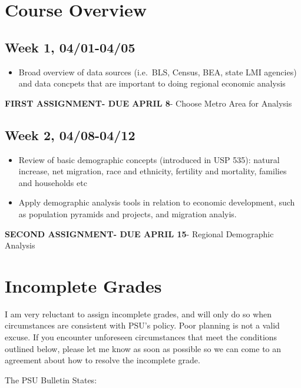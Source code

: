 \documentclass[11pt,]{article}
\providecommand{\tightlist}{%
  \setlength{\itemsep}{0pt}\setlength{\parskip}{0pt}}
\begin{document}
\section{Course Overview}\label{course-overview}

\subsection{Week 1, 04/01-04/05}\label{week-1-0401-0405}

\begin{itemize}
\tightlist
\item
  Broad overview of data sources (i.e.~BLS, Census, BEA, state LMI
  agencies) and data concpets that are important to doing regional
  economic analysis
\end{itemize}

\textbf{FIRST ASSIGNMENT- DUE APRIL 8}- Choose Metro Area for Analysis

\subsection{Week 2, 04/08-04/12}\label{week-2-0408-0412}

\begin{itemize}
\item
  Review of basic demographic concepts (introduced in USP 535): natural
  increase, net migration, race and ethnicity, fertility and mortality,
  families and households etc
\item
  Apply demographic analysis tools in relation to economic development,
  such as population pyramids and projects, and migration analyis.
\end{itemize}

\textbf{SECOND ASSIGNMENT- DUE APRIL 15}- Regional Demographic Analysis

\section{Incomplete Grades}\label{incomplete-grades}

I am very reluctant to assign incomplete grades, and will only do so
when circumstances are consistent with PSU's policy. Poor planning is
not a valid excuse. If you encounter unforeseen circumstances that meet
the conditions outlined below, please let me know as soon as possible so
we can come to an agreement about how to resolve the incomplete grade.

The PSU Bulletin States:
\end{document}
